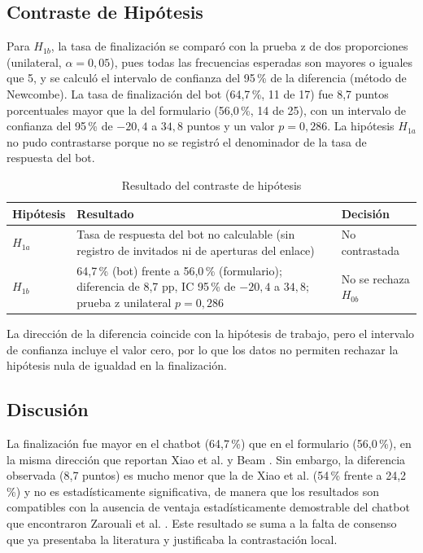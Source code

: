 \documentclass[12pt,letterpaper]{article}
\begin{document}
\subsection{Contraste de Hipótesis}

Para $H_{1b}$, la tasa de finalización se comparó con la prueba z de dos proporciones (unilateral, $\alpha=0{,}05$), pues todas las frecuencias esperadas son mayores o iguales que 5, y se calculó el intervalo de confianza del 95\,\% de la diferencia (método de Newcombe). La tasa de finalización del bot (64,7\,\%, 11 de 17) fue 8,7 puntos porcentuales mayor que la del formulario (56,0\,\%, 14 de 25), con un intervalo de confianza del 95\,\% de $-20{,}4$ a $34{,}8$ puntos y un valor $p=0{,}286$. La hipótesis $H_{1a}$ no pudo contrastarse porque no se registró el denominador de la tasa de respuesta del bot.

\begin{table}[htbp]
\centering
\caption{Resultado del contraste de hipótesis}
\label{tab:hipotesis}
\small
\begin{tabular}{|p{1.6cm}|p{9.2cm}|p{3.5cm}|}
\hline
\textbf{Hipótesis} & \textbf{Resultado} & \textbf{Decisión} \\ \hline
$H_{1a}$ & Tasa de respuesta del bot no calculable (sin registro de invitados ni de aperturas del enlace) & No contrastada \\ \hline
$H_{1b}$ & 64,7\,\% (bot) frente a 56,0\,\% (formulario); diferencia de 8,7 pp, IC 95\,\% de $-20{,}4$ a $34{,}8$; prueba z unilateral $p=0{,}286$ & No se rechaza $H_{0b}$ \\ \hline
\end{tabular}
\end{table}

La dirección de la diferencia coincide con la hipótesis de trabajo, pero el intervalo de confianza incluye el valor cero, por lo que los datos no permiten rechazar la hipótesis nula de igualdad en la finalización.

\subsection{Discusión}

La finalización fue mayor en el chatbot (64,7\,\%) que en el formulario (56,0\,\%), en la misma dirección que reportan Xiao et al. \cite{xiao2020} y Beam \cite{beam2023}. Sin embargo, la diferencia observada (8,7 puntos) es mucho menor que la de Xiao et al. (54\,\% frente a 24,2\,\%) y no es estadísticamente significativa, de manera que los resultados son compatibles con la ausencia de ventaja estadísticamente demostrable del chatbot que encontraron Zarouali et al. \cite{zarouali2023}. Este resultado se suma a la falta de consenso que ya presentaba la literatura y justificaba la contrastación local.
\end{document}
